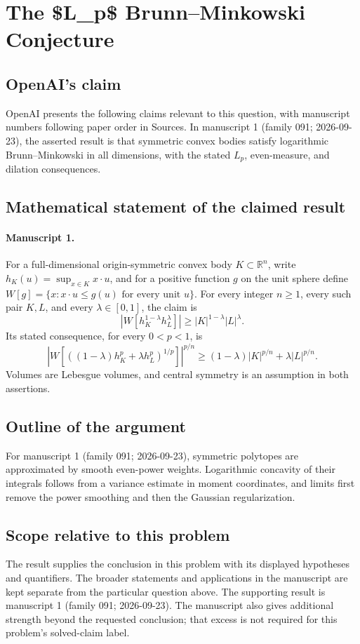 \documentclass[11pt]{article}
\begin{document}
\section*{The \$L\_p\$ Brunn–Minkowski Conjecture}

\subsection{OpenAI's claim}
OpenAI presents the following claims relevant to this question, with manuscript numbers following paper order in Sources. In manuscript 1 (family 091; 2026-09-23), the asserted result is that symmetric convex bodies satisfy logarithmic Brunn--Minkowski in all dimensions, with the stated $L_p$, even-measure, and dilation consequences.

\subsection{Mathematical statement of the claimed result}
\paragraph{Manuscript 1.}
For a full-dimensional origin-symmetric convex body $K\subset\mathbb R^n$, write $h_K(u)=\sup_{x\in K}x\cdot u$, and for a positive function $g$ on the unit sphere define $W[g]=\{x:x\cdot u\le g(u)\text{ for every unit }u\}$. For every integer $n\ge1$, every such pair $K,L$, and every $\lambda\in[0,1]$, the claim is
\[
 |W[h_K^{1-\lambda}h_L^{\lambda}]|\ge |K|^{1-\lambda}|L|^{\lambda}.
\]
Its stated consequence, for every $0<p<1$, is
\[
 \left|W[((1-\lambda)h_K^p+\lambda h_L^p)^{1/p}]\right|^{p/n}
 \ge(1-\lambda)|K|^{p/n}+\lambda|L|^{p/n}.
\]
Volumes are Lebesgue volumes, and central symmetry is an assumption in both assertions.

\subsection{Outline of the argument}
For manuscript 1 (family 091; 2026-09-23), symmetric polytopes are approximated by smooth even-power weights. Logarithmic concavity of their integrals follows from a variance estimate in moment coordinates, and limits first remove the power smoothing and then the Gaussian regularization.

\subsection{Scope relative to this problem}
The result supplies the conclusion in this problem with its displayed hypotheses and quantifiers. The broader statements and applications in the manuscript are kept separate from the particular question above. The supporting result is manuscript 1 (family 091; 2026-09-23). The manuscript also gives additional strength beyond the requested conclusion; that excess is not required for this problem's solved-claim label.
\end{document}
